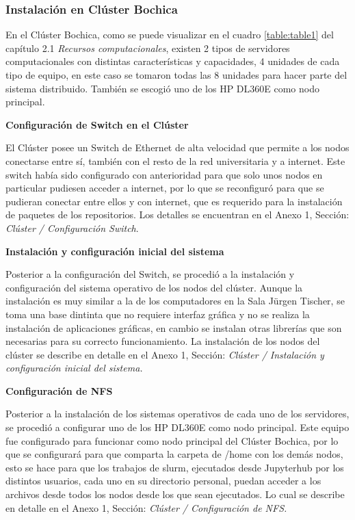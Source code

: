 \begin{spacing}{1.5}
\subsubsection{Instalación en Clúster Bochica}

En el Clúster Bochica, como se puede visualizar en el cuadro \ref{table:table1} del capítulo 2.1 \textit{Recursos computacionales}, existen 2 tipos de servidores computacionales con distintas características y capacidades, 4 unidades de cada tipo de equipo, en este caso se tomaron todas las 8 unidades para hacer parte del sistema distribuido. También se escogió uno de los HP DL360E como nodo principal.

\textbf{Configuración de Switch en el Clúster}

El Clúster posee un Switch de Ethernet de alta velocidad que permite a los nodos conectarse entre sí, también con el resto de la red universitaria y a internet. Este switch había sido configurado con anterioridad para que solo unos nodos en particular pudiesen acceder a internet, por lo que se reconfiguró para que se pudieran conectar entre ellos y con internet, que es requerido para la instalación de paquetes de los repositorios. Los detalles se encuentran en el Anexo 1, Sección: \textit{Clúster / Configuración Switch}.

\textbf{Instalación y configuración inicial del sistema}

Posterior a la configuración del Switch, se procedió a la instalación y configuración del sistema operativo de los nodos del clúster. Aunque la instalación es muy similar a la de los computadores en la Sala Jürgen Tischer, se toma una base dintinta que no requiere interfaz gráfica y no se realiza la instalación de aplicaciones gráficas, en cambio se instalan otras librerías que son necesarias para su correcto funcionamiento. La instalación de los nodos del clúster se describe en detalle en el Anexo 1, Sección: \textit{Clúster / Instalación y configuración inicial del sistema.}

\textbf{Configuración de NFS}

Posterior a la instalación de los sistemas operativos de cada uno de los servidores, se procedió a configurar uno de los HP DL360E como nodo principal. Este equipo fue configurado para funcionar como nodo principal del Clúster Bochica, por lo que se configurará para que comparta la carpeta de /home con los demás nodos, esto se hace para que los trabajos de slurm, ejecutados desde Jupyterhub por los distintos usuarios, cada uno en su directorio personal, puedan acceder a los archivos desde todos los nodos desde los que sean ejecutados. Lo cual se describe en detalle en el Anexo 1, Sección: \textit{Clúster / Configuración de NFS.}


\end{spacing}
